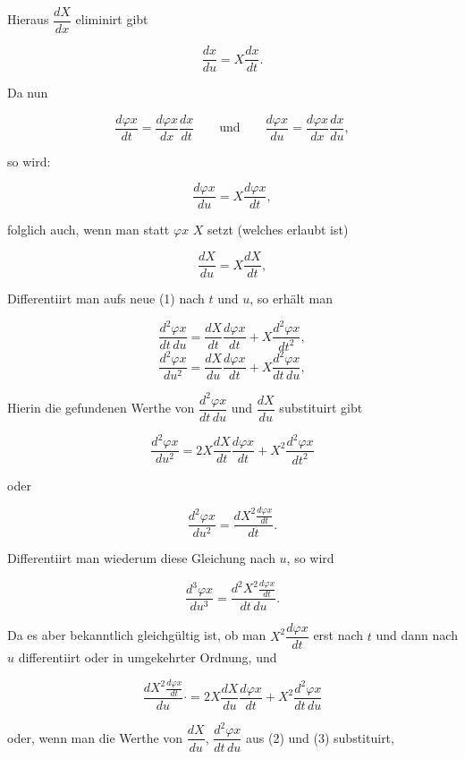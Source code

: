 
\noindent
Hieraus $\dfrac{dX}{dx}$ eliminirt gibt

\[
\frac{dx}{du} = X\frac{dx}{dt}.
\]

\noindent
Da nun

\[
\frac{d\varphi x}{dt} = \frac{d\varphi x}{dx}\frac{dx}{dt} \qquad \text{und} \qquad
\frac{d\varphi x}{du} = \frac{d\varphi x}{dx}\frac{dx}{du},
\]

\noindent
so wird:

\begin{equation}\tag{1}
\frac{d\varphi x}{du} = X\frac{d\varphi x}{dt},
\end{equation}

\noindent
folglich auch, wenn man statt $\varphi x$ $X$ setzt (welches erlaubt ist)

\begin{equation}\tag{2}
\frac{dX}{du} = X\frac{dX}{dt},
\end{equation}

\noindent
Differentiirt man aufs neue (1) nach $t$ und $u$, so erhält man

\begin{equation}\tag{3}
\frac{d^2\varphi x}{dt\,du}=\frac{dX}{dt}\frac{d\varphi x}{dt}+X\frac{d^2\varphi x}{dt^2},
\end{equation}
\[
\frac{d^2\varphi x}{du^2}=\frac{dX}{du}\frac{d\varphi x}{dt}+X\frac{d^2\varphi x}{dt\,du},
\]

\noindent
Hierin die gefundenen Werthe von $\dfrac{d^2\varphi x}{dt\,du}$ und $\dfrac{dX}{du}$
substituirt gibt

\[
\frac{d^2\varphi x}{du^2} = 2X\frac{dX}{dt}\frac{d\varphi x}{dt} + X^2\frac{d^2\varphi x}{dt^2}
\]

\noindent
oder

\begin{equation}\tag{4}
\frac{d^2\varphi x}{du^2} = \frac{dX^2 \frac{d\varphi x}{dt}}{dt}.
\end{equation}

\noindent
Differentiirt man wiederum diese Gleichung nach $u$, so wird

\[
\frac{d^3\varphi x}{du^3} = \frac{d^2X^2 \frac{d\varphi x}{dt}}{dt\,du}.
\]

\noindent\hspace*{\parindent}Da es aber bekanntlich gleichgültig ist, ob man $X^2\dfrac{d\varphi x}{dt}$ erst nach
$t$ und dann nach $u$ differentiirt oder in umgekehrter Ordnung, und

\[
\frac{dX^2 \frac{d\varphi x}{dt}}{du}\mathord{\cdot} = 2X\frac{dX}{du}\frac{d\varphi x}{dt} + X^2\frac{d^2\varphi x}{dt\,du}
\]

\noindent
oder, wenn man die Werthe von $\dfrac{dX}{du}$, $\dfrac{d^2\varphi x}{dt\,du}$ aus
(2) und (3) substituirt,
